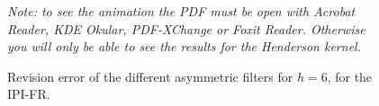 \documentclass[
  12pt,
  ,
  a4paper]{article}
\newcommand\1{\mathds{1}}
\begin{document}
\begin{figure}[!ht]
\caption{Revision error of the different asymmetric filters for $h=6$, for the IPI-FR.}\label{fig:filtersasymErr}\footnotesize
\emph{Note: to see the animation the PDF must be open with Acrobat Reader, KDE Okular, PDF-XChange or Foxit Reader.
Otherwise you will only be able to see the results for the Henderson kernel.}
\end{figure}
\newpage

\printbibliography[title=References]
\end{document}
